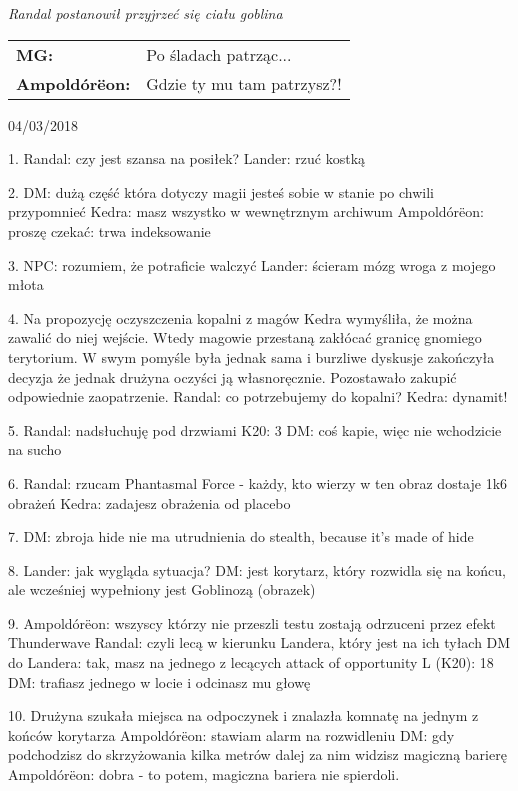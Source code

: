 \documentclass[10pt,twoside,twocolumn]{book}
\begin{document}
\begin{rpg-quotebox}{}
   \textit{Randal postanowił przyjrzeć się ciału goblina}\\

   \begin{tabularx}{\columnwidth}{lX}
      \textbf{MG:} &  Po śladach patrząc...\\
      \textbf{Ampoldórëon:} &  Gdzie ty mu tam patrzysz?!\\
   \end{tabularx}
\end{rpg-quotebox}

04/03/2018

1. Randal: czy jest szansa na posiłek?
Lander: rzuć kostką

2. DM: dużą część która dotyczy magii jesteś sobie w stanie po chwili przypomnieć
Kedra: masz wszystko w wewnętrznym archiwum
Ampoldórëon: proszę czekać: trwa indeksowanie

3. NPC: rozumiem, że potraficie walczyć
Lander: ścieram mózg wroga z mojego młota

4. Na propozycję oczyszczenia kopalni z magów Kedra wymyśliła, że można zawalić do niej wejście. Wtedy magowie przestaną zakłócać granicę gnomiego terytorium. W swym pomyśle była jednak sama i burzliwe dyskusje zakończyła decyzja że jednak drużyna oczyści ją własnoręcznie. Pozostawało zakupić odpowiednie zaopatrzenie.
Randal: co potrzebujemy do kopalni?
Kedra: dynamit!

5. Randal: nadsłuchuję pod drzwiami
K20: 3
DM: coś kapie, więc nie wchodzicie na sucho

6. Randal: rzucam Phantasmal Force - każdy, kto wierzy w ten obraz dostaje 1k6 obrażeń
Kedra: zadajesz obrażenia od placebo

7. DM: zbroja hide nie ma utrudnienia do stealth, because it's made of hide

8. Lander: jak wygląda sytuacja?
DM: jest korytarz, który rozwidla się na końcu, ale wcześniej wypełniony jest Goblinozą
(obrazek)

9. Ampoldórëon: wszyscy którzy nie przeszli testu zostają odrzuceni przez efekt Thunderwave
Randal: czyli lecą w kierunku Landera, który jest na ich tyłach
DM do Landera: tak, masz na jednego z lecących attack of opportunity
L (K20): 18
DM: trafiasz jednego w locie i odcinasz mu głowę

10. Drużyna szukała miejsca na odpoczynek i znalazła komnatę na jednym z końców korytarza
Ampoldórëon: stawiam alarm na rozwidleniu
DM: gdy podchodzisz do skrzyżowania kilka metrów dalej za nim widzisz magiczną barierę
Ampoldórëon: dobra - to potem, magiczna bariera nie spierdoli.
\end{document}
